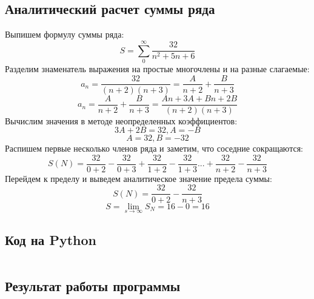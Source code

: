 \documentclass[a4paper,12pt]{article}
\newenvironment{longlisting}{\captionsetup{type=listing}}{}
\begin{document}
\subsection{Аналитический расчет суммы ряда}
Выпишем формулу суммы ряда:
   $$S = \sum_{0}^{\infty} \frac{32}{n^2 +5n + 6}$$
Разделим знаменатель выражения на простые многочлены и на разные слагаемые:
   $$a_n =  \frac{32}{(n+2)(n+3)} = \frac{A}{n+2} + \frac{B}{n+3}$$
   $$$$
   $$a_n = \frac{A}{n+2} + \frac{B}{n+3} = \frac{An + 3A + Bn + 2B}{(n+2)(n+3)}$$
Вычислим значения в методе неопределенных коэффициентов:
   $$3A + 2B = 32, A=-B$$
   $$A=32, B=-32$$
Распишем первые несколько членов ряда и заметим, что соседние сокращаются:
   $$S(N) = \frac{32}{0+2} - \frac{32}{0+3} + \frac{32}{1+2} - \frac{32}{1+3}  ... + \frac{32}{n+2} - \frac{32}{n+3}$$
Перейдем к пределу и выведем аналитическое значение предела суммы:
   $$S(N) = \frac{32}{0+2} - \frac{32}{n+3}$$
   $$S = \lim_{s\rightarrow \infty}S_N = 16 - 0 = 16$$

\subsection{Код на Python}

\begin{longlisting}
\inputminted{python}{series.py}
\end{longlisting}

\subsection{Результат работы программы}
\begin{longlisting}

\end{longlisting}
\end{document}
